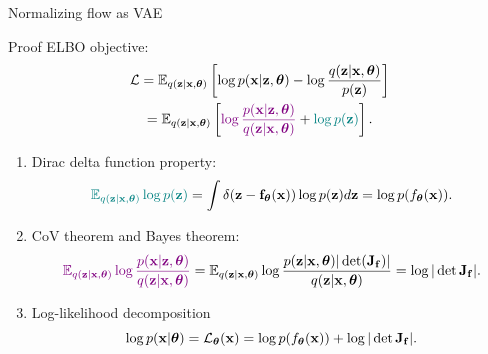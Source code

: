 \documentclass{beamer}
\begin{document}
\begin{frame}{Normalizing flow as VAE}
	\begin{block}{Proof}
		ELBO objective:
		\vspace{-0.5cm}
		\begin{multline*}
			\mathcal{L}  = \mathbb{E}_{q(\mathbf{z} | \mathbf{x}, \boldsymbol{\theta})} \left[\log p(\mathbf{x} | \mathbf{z}, \boldsymbol{\theta}) - \log \frac{q(\mathbf{z} | \mathbf{x}, \boldsymbol{\theta})}{p(\mathbf{z})} \right]  \\
			= \mathbb{E}_{q(\mathbf{z} | \mathbf{x}, \boldsymbol{\theta})} \left[{\color{violet}\log \frac{p(\mathbf{x} | \mathbf{z}, \boldsymbol{\theta})}{q(\mathbf{z} | \mathbf{x}, \boldsymbol{\theta})}} + {\color{teal}\log p(\mathbf{z})} \right].
		\end{multline*}
		\vspace{-0.6cm}
		\begin{enumerate}
			\item  Dirac delta function property:
			\vspace{-0.3cm}
			\[
				{\color{teal}\mathbb{E}_{q(\mathbf{z} | \mathbf{x}, \boldsymbol{\theta})} \log p(\mathbf{z})} = \int \delta (\mathbf{z} - \mathbf{f}_{\boldsymbol{\theta}}(\mathbf{x})) \log p(\mathbf{z}) d \mathbf{z} = \log p(f_{\boldsymbol{\theta}}(\mathbf{x})).
			\]
			\vspace{-0.6cm}
			\item CoV theorem and Bayes theorem:
			\vspace{-0.2cm}
			{ \small
			\[ 
				{\color{violet}\mathbb{E}_{q(\mathbf{z} | \mathbf{x}, \boldsymbol{\theta})} \log \frac{p(\mathbf{x} | \mathbf{z}, \boldsymbol{\theta})}{q(\mathbf{z} | \mathbf{x}, \boldsymbol{\theta})}} = \mathbb{E}_{q(\mathbf{z} | \mathbf{x}, \boldsymbol{\theta})} \log \frac{p(\mathbf{z} | \mathbf{x}, \boldsymbol{\theta}) |\det (\mathbf{J}_{\mathbf{f}})|}{q(\mathbf{z} | \mathbf{x}, \boldsymbol{\theta})} = \log |\det \mathbf{J}_{\mathbf{f}}|.
			\]
			}
			\vspace{-0.6cm}
			\item Log-likelihood decomposition
			\vspace{-0.3cm}
			\[
				\log p(\mathbf{x} | \boldsymbol{\theta}) = \mathcal{L}_{\boldsymbol{\theta}}(\mathbf{x}) = \log p(f_{\boldsymbol{\theta}}(\mathbf{x})) +  \log |\det \mathbf{J}_{\mathbf{f}}|.
			\]
		\end{enumerate}
	\end{block}
\end{frame}
\end{document}
